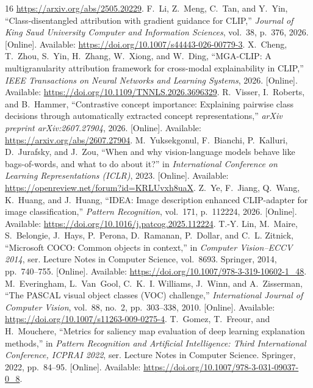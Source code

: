 \begin{thebibliography}{16}
\url{https://arxiv.org/abs/2505.20229}.
F.~Li, Z.~Meng, C.~Tan, and Y.~Yin, ``Class-disentangled attribution with gradient
guidance for {CLIP},'' \emph{Journal of King Saud University Computer and
Information Sciences}, vol.~38, p.~376, 2026. [Online]. Available:
\url{https://doi.org/10.1007/s44443-026-00779-3}.
X.~Cheng, T.~Zhou, S.~Yin, H.~Zhang, W.~Xiong, and W.~Ding, ``{MGA-CLIP}: A
multigranularity attribution framework for cross-modal explainability in
{CLIP},'' \emph{IEEE Transactions on Neural Networks and Learning Systems},
2026. [Online]. Available:
\url{https://doi.org/10.1109/TNNLS.2026.3696329}.
R.~Visser, I.~Roberts, and B.~Hammer, ``Contrastive concept importance:
Explaining pairwise class decisions through automatically extracted concept
representations,'' \emph{arXiv preprint arXiv:2607.27904}, 2026. [Online]. Available:
\url{https://arxiv.org/abs/2607.27904}.
M.~Yuksekgonul, F.~Bianchi, P.~Kalluri, D.~Jurafsky, and J.~Zou, ``When and why
vision-language models behave like bags-of-words, and what to do about it?'' in
\emph{International Conference on Learning Representations (ICLR)}, 2023.
[Online]. Available: \url{https://openreview.net/forum?id=KRLUvxh8uaX}.
Z.~Ye, F.~Jiang, Q.~Wang, K.~Huang, and J.~Huang, ``{IDEA}: Image description
enhanced {CLIP}-adapter for image classification,'' \emph{Pattern Recognition},
vol.~171, p.~112224, 2026. [Online]. Available:
\url{https://doi.org/10.1016/j.patcog.2025.112224}.
T.-Y. Lin, M.~Maire, S.~Belongie, J.~Hays, P.~Perona, D.~Ramanan, P.~Dollar,
and C.~L. Zitnick, ``Microsoft {COCO}: Common objects in context,'' in
\emph{Computer Vision--ECCV 2014}, ser. Lecture Notes in Computer Science,
vol.~8693. Springer, 2014, pp.~740--755. [Online]. Available:
\url{https://doi.org/10.1007/978-3-319-10602-1_48}.
M.~Everingham, L.~Van~Gool, C.~K.~I. Williams, J.~Winn, and A.~Zisserman,
``The {PASCAL} visual object classes ({VOC}) challenge,'' \emph{International
Journal of Computer Vision}, vol.~88, no.~2, pp.~303--338, 2010. [Online]. Available:
\url{https://doi.org/10.1007/s11263-009-0275-4}.
T.~Gomez, T.~Freour, and H.~Mouchere, ``Metrics for saliency map evaluation of
deep learning explanation methods,'' in \emph{Pattern Recognition and
Artificial Intelligence: Third International Conference, ICPRAI 2022}, ser.
Lecture Notes in Computer Science. Springer, 2022, pp.~84--95. [Online]. Available:
\url{https://doi.org/10.1007/978-3-031-09037-0_8}.
\end{thebibliography}
